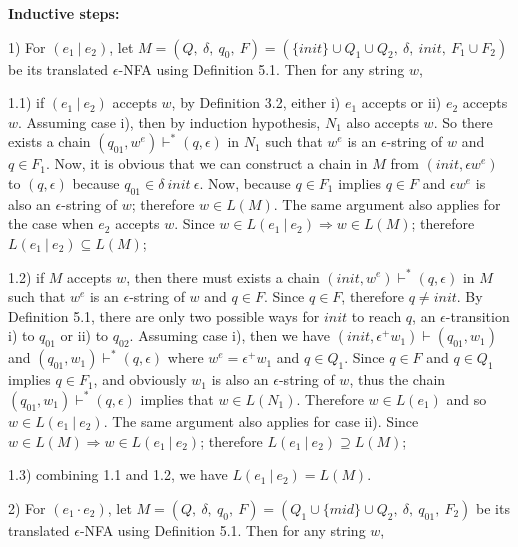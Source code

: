 \documentclass[twoside,openright,final]{bhamthesis}
\begin{document}
\par \textbf{Inductive steps:}
\par 1) For \((e_1\ |\ e_2)\), let \(M = (Q,\ \delta,\ q_0,\ F) = (\{init\} \cup Q_1 \cup Q_2,\
\delta,\ init,\ F_1 \cup F_2)\) be its translated \(\epsilon\)-NFA
using Definition 5.1. Then for any string \(w\), 

\par 1.1) if \((e_1\ |\ e_2)\) accepts \(w\), by Definition 3.2,
either i) \(e_1\) accepts or ii) \(e_2\) accepts \(w\). Assuming case i), then by
induction hypothesis, \(N_1\) also accepts \(w\). So there exists a chain
\((q_{01} , w^e) \vdash^* (q , \epsilon)\) in \(N_1\) such that
\(w^e\) is an \(\epsilon\)-string of \(w\) and \(q \in F_1\). Now, it is obvious that we can construct a
chain in \(M\) from \((init , \epsilon w^e)\) to \((q , \epsilon)\)
because \(q_{01} \in \delta\ init\ \epsilon\). Now, because \(q \in
F_1\) implies \(q \in F\) and \(\epsilon w^e\)
is also an \(\epsilon\)-string of \(w\); therefore \(w \in L(M)\). The same argument also applies
for the case when \(e_2\) accepts \(w\). Since \(w \in L(e_1\ |\ e_2)
\Rightarrow w \in L(M)\); therefore \(L(e_1\ |\ e_2) \subseteq L(M)\);

\par 1.2) if \(M\) accepts \(w\), then there must exists a chain \((init , w^e) \vdash^* (q ,
\epsilon)\) in \(M\) such that \(w^e\) is an \(\epsilon\)-string of \(w\) and \(q
\in F\). Since \(q \in F\), therefore \(q \neq init\). By Definition
5.1, there are only two possible ways for \(init\) to reach \(q\), an
\(\epsilon\)-transition i) to \(q_{01}\) or ii) to
\(q_{02}\). Assuming case i), then we have \((init , \epsilon^+w_1) \vdash
(q_{01} , w_1)\) and \((q_{01} , w_1) \vdash^* (q , \epsilon)\) where \(w^e =
\epsilon^+w_1\) and \(q \in Q_1\). Since \(q \in F\) and \(q \in
Q_1\) implies \(q \in F_1\), and obviously \(w_1\) is also an
\(\epsilon\)-string of \(w\), thus the chain \((q_{01} , w_1) \vdash^* (q , \epsilon)\)
implies that \(w \in L(N_1)\). Therefore \(w \in L(e_1)\) and so \(w \in L(e_1\
|\ e_2)\). The same argument also applies for case ii). Since \(w \in
L(M) \Rightarrow w \in L(e_1\ |\ e_2)\); therefore \(L(e_1\ |\ e_2) \supseteq L(M)\);

\par 1.3) combining 1.1  and 1.2, we have \(L(e_1\ |\ e_2) = L(M)\). 

\par 2) For \((e_1 \cdot e_2)\), let \(M = (Q,\ \delta,\ q_0,\ F) = (Q_1 \cup \{mid\} \cup Q_2,\ \delta,\ q_{01},\ F_2)\) be its
translated \(\epsilon\)-NFA using Definition 5.1. Then for any string
\(w\), 
\end{document}
